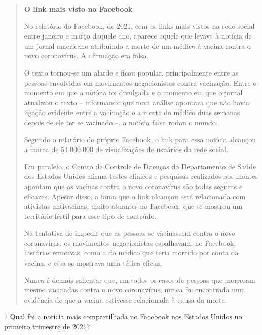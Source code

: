 \begin{quote}
\textbf{O link mais visto no Facebook}

No relatório do Facebook, de 2021, com os links mais vistos na rede social
entre janeiro e março daquele ano, aparece aquele que levava à notícia
de um jornal americano atribuindo a morte de um médico à vacina contra
o novo coronavírus. A afirmação era falsa.

O texto tornou-se um alarde e ficou popular, principalmente entre as pessoas
envolvidas em movimentos negacionistas contra vacinação. Entre o momento em
que a notícia foi divulgada e o momento em que o jornal atualizou o texto –
informando que nova análise apontava que não havia ligação evidente entre a
vacinação e a morte do médico duas semanas depois de ele ter se vacinado –,
a notícia falsa rodou o mundo.

Segundo o relatório do próprio Facebook, o link para essa notícia alcançou
a marca de 54.000.000 de visualizações de usuários da rede social.

Em paralelo, o Centro de Controle de Doenças do Departamento de Saúde dos Estados
Unidos afirma testes clínicos e pesquisas realizados aos montes apontam que as
vacinas contra o novo coronavírus são todas seguras e eficazes. Apesar disso, a
fama que o link alcançou está relacionada com ativistas antivacinas, muito atuantes
no Facebook, que se mostrou um território fértil para esse tipo de conteúdo.

Na tentativa de impedir que as pessoas se vacinassem contra o novo coronavírus,
os movimentos negacionistas espalhavam, no Facebook, histórias emotivas, como
a do médico que teria morrido por conta da vacina, e essa se mostrava uma
tática eficaz.

Nunca é demais salientar que, em todos os casos de pessoas que morreram
mesmo vacinadas contra o novo coronavírus, nunca foi encontrada uma evidência
de que a vacina estivesse relacionada à causa da morte.

\end{quote}


\num{1} Qual foi a notícia mais compartilhada no Facebook nos Estados
Unidos no primeiro trimestre de 2021?


